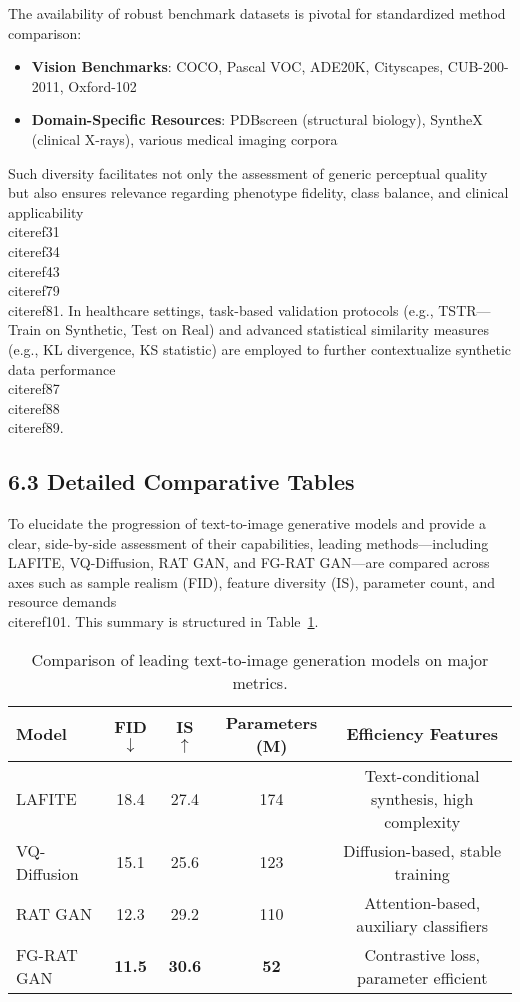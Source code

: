 \documentclass[11pt]{article}
\begin{document}
The availability of robust benchmark datasets is pivotal for standardized method comparison:

\begin{itemize}
    \item \textbf{Vision Benchmarks}: COCO, Pascal VOC, ADE20K, Cityscapes, CUB-200-2011, Oxford-102
    \item \textbf{Domain-Specific Resources}: PDBscreen (structural biology), SyntheX (clinical X-rays), various medical imaging corpora
\end{itemize}

Such diversity facilitates not only the assessment of generic perceptual quality but also ensures relevance regarding phenotype fidelity, class balance, and clinical applicability \\cite{ref31}\\cite{ref34}\\cite{ref43}\\cite{ref79}\\cite{ref81}. In healthcare settings, task-based validation protocols (e.g., TSTR—Train on Synthetic, Test on Real) and advanced statistical similarity measures (e.g., KL divergence, KS statistic) are employed to further contextualize synthetic data performance \\cite{ref87}\\cite{ref88}\\cite{ref89}.

\subsection{6.3 Detailed Comparative Tables}

To elucidate the progression of text-to-image generative models and provide a clear, side-by-side assessment of their capabilities, leading methods—including LAFITE, VQ-Diffusion, RAT GAN, and FG-RAT GAN—are compared across axes such as sample realism (FID), feature diversity (IS), parameter count, and resource demands \\cite{ref101}. This summary is structured in Table~\ref{tab:text2image_comparison}.

\begin{table}[h]
\centering
\caption{Comparison of leading text-to-image generation models on major metrics.}
\label{tab:text2image_comparison}
\begin{tabular}{|l|c|c|c|c|}
    \hline
    \textbf{Model} & \textbf{FID} $\downarrow$ & \textbf{IS} $\uparrow$ & \textbf{Parameters (M)} & \textbf{Efficiency Features} \\ \hline
    LAFITE      & 18.4    & 27.4   & 174     & Text-conditional synthesis, high complexity \\
    VQ-Diffusion& 15.1    & 25.6   & 123     & Diffusion-based, stable training \\
    RAT GAN     & 12.3    & 29.2   & 110     & Attention-based, auxiliary classifiers \\
    FG-RAT GAN  & \textbf{11.5}    & \textbf{30.6}   & \textbf{52}      & Contrastive loss, parameter efficient \\
    \hline
\end{tabular}
\end{table}
\end{document}
